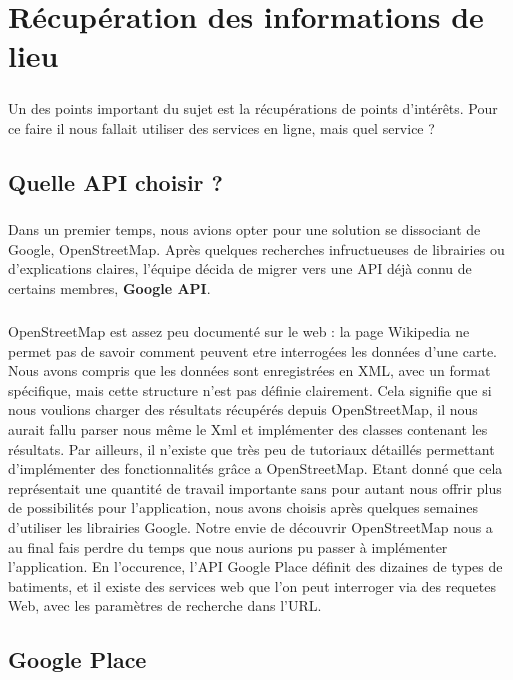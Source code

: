 \chapter{Récupération des informations de lieu}
\paragraph{}
Un des points important du sujet est la récupérations de points d'intérêts. Pour ce faire il nous fallait utiliser des services en ligne, mais quel service ?

\section*{Quelle API choisir ?}
\paragraph{} 
Dans un premier temps, nous avions opter pour une solution se dissociant de Google, OpenStreetMap. Après quelques recherches infructueuses de librairies ou d'explications claires, l'équipe décida de migrer vers une API déjà connu de certains membres, \textbf{Google API}.
\paragraph{}
OpenStreetMap est assez peu documenté sur le web : la page Wikipedia ne permet pas de savoir comment peuvent etre interrogées les données d'une carte. Nous avons compris que les données sont enregistrées en XML, avec un format spécifique, mais cette structure n'est pas définie clairement. Cela signifie que si nous voulions charger des résultats récupérés depuis OpenStreetMap, il nous aurait fallu parser nous même le Xml et implémenter des classes contenant les résultats.
Par ailleurs, il n'existe que très peu de tutoriaux détaillés permettant d'implémenter des fonctionnalités grâce a OpenStreetMap.
Etant donné que cela représentait une quantité de travail importante sans pour autant nous offrir plus de possibilités pour l'application, nous avons choisis après quelques semaines d'utiliser les librairies Google. Notre envie de découvrir OpenStreetMap nous a au final fais perdre du temps que nous aurions pu passer à implémenter l'application.
En l'occurence, l'API Google Place définit des dizaines de types de batiments, et il existe des services web que l'on peut interroger via des requetes Web, avec les paramètres de recherche dans l'URL.

\section*{Google Place}
